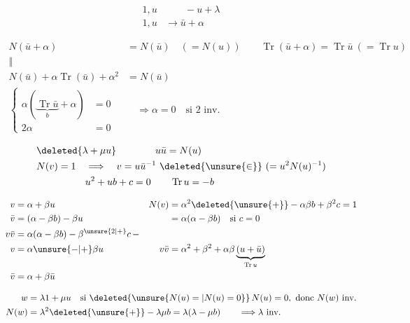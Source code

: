 
\[
\begin{aligned}
1,u&\qquad -u+\lambda\\
1,u&\longrightarrow \bar u+\alpha
\end{aligned}
\]

\[
\begin{aligned}
N(\bar u+\alpha)&=N(\bar u)\quad(=N(u))\qquad
\operatorname{Tr}(\bar u+\alpha)=\operatorname{Tr}\bar u\ (= \operatorname{Tr}u)\\
\Vert&\\
N(\bar u)+\alpha\operatorname{Tr}(\bar u)+\alpha^2&=N(\bar u)\\
\left\{\begin{aligned}\alpha(\underbrace{\operatorname{Tr}\bar u}_{b}+\alpha)&=0\\2\alpha&=0\end{aligned}\right.&\quad\Longrightarrow\alpha=0\quad\text{si $2$ inv.}
\end{aligned}
\]

\[
\begin{aligned}
&\deleted{\lambda+\mu u}\qquad\qquad u\bar u=N(u)\\
&N(v)=1\quad\Longrightarrow\quad v=u\bar u^{-1}\ \deleted{\unsure{\in}}\ (=u^2N(u)^{-1})\\
&\hspace{50pt}u^2+ub +c=0\qquad \operatorname{Tr}u=-b
\end{aligned}
\]

\[
\begin{aligned}
v&=\alpha+\beta u& N(v)&=\alpha^2\deleted{\unsure{+}}-\alpha\beta b+\beta^2c=1\\
\bar v&=(\alpha-\beta b)-\beta u&&=\alpha(\alpha-\beta b)\quad\text{si }c=0\\
v\bar v&=\alpha(\alpha-\beta b)-\beta^{\unsure{2|+}}c\,-\\
v&=\alpha\unsure{-|+}\beta u&v\bar v&=\alpha^2+\beta^2+\alpha\beta\underbrace{(u+\bar u)}_{\operatorname{Tr}u}\\
\bar v&=\alpha+\beta\bar u
\end{aligned}
\]

\[
\begin{aligned}
w&=\lambda1+\mu u\quad\text{si }\deleted{\unsure{N(u)=|N(u)=0}}\,N(u)=0,\ \text{donc }N(w)\ \text{inv.}\\
N(w)&=\lambda^2\deleted{\unsure{+}}-\lambda\mu b=\lambda(\lambda-\mu b)\qquad\Longrightarrow\lambda\ \text{inv.}
\end{aligned}
\]

